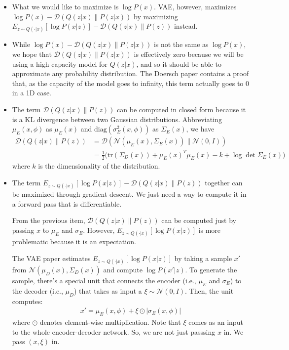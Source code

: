 \documentclass[10pt]{article}
\newcommand{\tr}{\mathrm{tr}}
\newcommand{\diag}{\mathrm{diag}}
\begin{document}
\begin{itemize}
  	\item What we would like to maximize is $\log P(x)$. VAE, however, maximizes $\log P(x) - \mathcal{D}(Q(z|x)\| P(z|x))$ by maximizing $E_{z \sim Q(\cdot|x)} [\log P(x|z)] 
  	  - \mathcal{D}(Q(z|x)\|P(z))$ instead.
	
	\item While $\log P(x) - \mathcal{D}(Q(z|x)\| P(z|x))$ is not the same as $\log P(x)$, we hope that $\mathcal{D}(Q(z|x)\| P(z|x))$ is effectively zero because we will be using a high-capacity model for $Q(z|x)$, and so it should be able to approximate any probability distribution. The Doersch paper \cite{doersch:2016} contains a proof that, as the capacity of the model goes to infinity, this term actually goes to $0$ in a 1D case.

  	\item The term $\mathcal{D}(Q(z|x)\|P(z))$ can be computed in closed form because it is a KL divergence between two Gaussian distributions. Abbreviating $\mu_E(x,\phi)$ as $\mu_E(x)$ and $\diag(\sigma^2_E(x,\phi))$ as $\Sigma_E(x)$, we have
  	\begin{align*}
  	  \mathcal{D}(Q(z|x)\|P(z))
  	  &= \mathcal{D}(\mathcal{N}(\mu_E(x),\Sigma_E(x))\|\mathcal{N}(0,I)) \\
  	  &= \frac{1}{2} \big( 
  	  \tr(\Sigma_D(x))
  	  + \mu_E(x)^T \mu_E(x)
  	  - k
  	  + \log \det \Sigma_E(x)
  	  \big)
  	\end{align*}
  	where $k$ is the dimensionality of the distribution.

  	\item The term $E_{z \sim Q(\cdot|x)} [\log P(x|z)] - \mathcal{D}(Q(z|x)\|P(z))$ together can be maximized through gradient descent. We just need a way to compute it in a forward pass that is differentiable.

  	From the previous item, $\mathcal{D}(Q(z|x)\|P(z))$ can be computed just by passing $x$ to $\mu_E$ and $\sigma_E$. However, $E_{z \sim Q(\cdot|x)} [\log P(x|z)]$ is more problematic because it is an expectation.

  	The VAE paper estimates $E_{z \sim Q(\cdot|x)} [\log P(x|z)]$ by taking a sample $x'$ from $\mathcal{N}(\mu_D(x), \Sigma_D(x))$ and compute $\log P(x'|z)$. To generate the sample, there's a special unit that connects the encoder (i.e., $\mu_E$ and $\sigma_E$) to the decoder (i.e., $\mu_D$) that takes as input a $\xi \sim \mathcal{N}(0,I)$. Then, the unit computes:
  	\begin{align*}
  	  x' = \mu_E(x,\phi) + \xi \odot |\sigma_E(x,\phi)|
  	\end{align*}
  	where $\odot$ denotes element-wise multiplication. Note that $\xi$ comes as an input to the whole encoder-decoder network. So, we are not just passsing $x$ in. We pass $(x, \xi)$ in.


\end{itemize}
\end{document}
